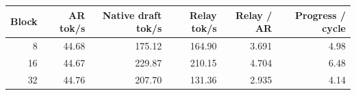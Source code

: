 \begin{tabular}{rrrrrr}
\toprule
Block & AR tok/s & Native draft tok/s & Relay tok/s & Relay / AR & Progress / cycle \\
\midrule
8 & 44.68 & 175.12 & 164.90 & 3.691 & 4.98 \\
16 & 44.67 & 229.87 & 210.15 & 4.704 & 6.48 \\
32 & 44.76 & 207.70 & 131.36 & 2.935 & 4.14 \\
\bottomrule
\end{tabular}
